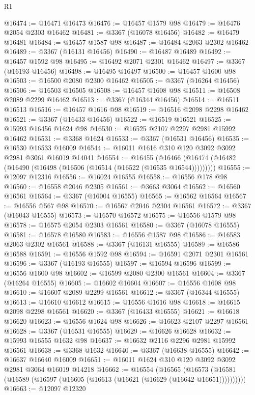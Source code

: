 \begin{lexlean}{R1}
\begin{coremodule}
@16474 := @16471 @16473
@16476 := @16457 @1579 @98
@16479 := @16476 @2054 @2303 @16462
@16481 := @3367 (@16078 @16456)
@16482 := @16479 @16481
@16484 := @16457 @1587 @98
@16487 := @16484 @2063 @2302 @16462
@16489 := @3367 (@16131 @16456)
@16490 := @16487 @16489
@16492 := @16457 @1592 @98
@16495 := @16492 @2071 @2301 @16462
@16497 := @3367 (@16193 @16456)
@16498 := @16495 @16497
@16500 := @16457 @1600 @98
@16503 := @16500 @2080 @2300 @16462
@16505 := @3367 (@16264 @16456)
@16506 := @16503 @16505
@16508 := @16457 @1608 @98
@16511 := @16508 @2089 @2299 @16462
@16513 := @3367 (@16344 @16456)
@16514 := @16511 @16513
@16516 := @16457 @1616 @98
@16519 := @16516 @2098 @2298 @16462
@16521 := @3367 (@16433 @16456)
@16522 := @16519 @16521
@16525 := @15993 @16456 @1624 @98
@16530 := @16525 @2107 @2297 @2981 @15992 @16462
@16531 := @3368 @1624
@16533 := @3367 (@16531 @16456)
@16535 := @16530 @16533 @16009
@16544 := @16011 @1616 @310 @120 @3092 @3092 @2981 @3061 @16019 @14041
@16554 := @16455
    (@16466 (@16474 (@16482 (@16490 (@16498 (@16506 (@16514 (@16522 (@16535 @16544)))))))))
@16555 := @12097 @12316
@16556 := @16024 @16555
@16558 := @16556 @178 @98
@16560 := @16558 @2046 @2305
@16561 := @3663 @3064
@16562 := @16560 @16561
@16564 := @3367 (@16004 @16555)
@16565 := @16562 @16564
@16567 := @16556 @567 @98
@16570 := @16567 @2046 @2304 @16561
@16572 := @3367 (@16043 @16555)
@16573 := @16570 @16572
@16575 := @16556 @1579 @98
@16578 := @16575 @2054 @2303 @16561
@16580 := @3367 (@16078 @16555)
@16581 := @16578 @16580
@16583 := @16556 @1587 @98
@16586 := @16583 @2063 @2302 @16561
@16588 := @3367 (@16131 @16555)
@16589 := @16586 @16588
@16591 := @16556 @1592 @98
@16594 := @16591 @2071 @2301 @16561
@16596 := @3367 (@16193 @16555)
@16597 := @16594 @16596
@16599 := @16556 @1600 @98
@16602 := @16599 @2080 @2300 @16561
@16604 := @3367 (@16264 @16555)
@16605 := @16602 @16604
@16607 := @16556 @1608 @98
@16610 := @16607 @2089 @2299 @16561
@16612 := @3367 (@16344 @16555)
@16613 := @16610 @16612
@16615 := @16556 @1616 @98
@16618 := @16615 @2098 @2298 @16561
@16620 := @3367 (@16433 @16555)
@16621 := @16618 @16620
@16623 := @16556 @1624 @98
@16626 := @16623 @2107 @2297 @16561
@16628 := @3367 (@16531 @16555)
@16629 := @16626 @16628
@16632 := @15993 @16555 @1632 @98
@16637 := @16632 @2116 @2296 @2981 @15992 @16561
@16638 := @3368 @1632
@16640 := @3367 (@16638 @16555)
@16642 := @16637 @16640 @16009
@16651 := @16011 @1624 @310 @120 @3092 @3092 @2981 @3064 @16019 @14218
@16662 := @16554
    (@16565 (@16573 (@16581 (@16589 (@16597 (@16605 (@16613 (@16621 (@16629 (@16642 @16651))))))))))
@16663 := @12097 @12320

\end{coremodule}
\end{lexlean}
